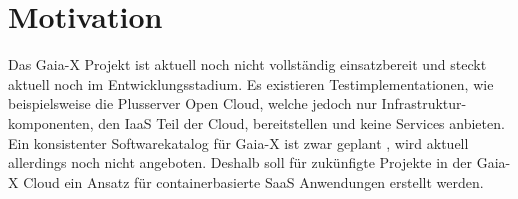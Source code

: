 \section{Motivation}
Das Gaia-X Projekt ist aktuell noch nicht vollständig einsatzbereit und steckt aktuell noch im Entwicklungsstadium.
Es existieren Testimplementationen, wie beispielsweise die Plusserver Open Cloud, welche jedoch nur Infrastruktur-
komponenten, den \ac{IaaS} Teil der Cloud, bereitstellen und keine Services anbieten. Ein konsistenter Softwarekatalog für Gaia-X ist zwar geplant \cite{BMWi2019},
wird aktuell allerdings noch nicht angeboten. Deshalb soll für zukünfigte Projekte in der Gaia-X Cloud ein Ansatz
für containerbasierte \ac{SaaS} Anwendungen erstellt werden.